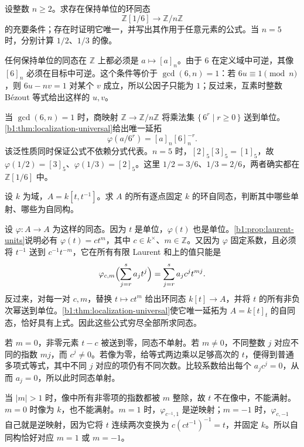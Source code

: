\begin{exercise}\label{b1:ex:13-10}
	设整数 \(n\geq2\)。求存在保持单位的环同态
	\[
		\mathbb Z[1/6]\longrightarrow\mathbb Z/n\mathbb Z
	\]
	的充要条件；存在时证明它唯一，并写出其作用于任意元素的公式。当 \(n=5\) 时，分别计算 \(1/2\)、\(1/3\) 的像。
\end{exercise}
\begin{solution}
	任何保持单位的同态在 \(\mathbb Z\) 上都必须是 \(a\mapsto[a]_n\)。由于 \(6\) 在定义域中可逆，其像 \([6]_n\) 必须在目标中可逆。这个条件等价于 \(\gcd(6,n)=1\)：若 \(6u\equiv1\pmod n\)，则 \(6u-nv=1\) 对某个 \(v\) 成立，所以公因子只能为 \(1\)；反过来，互素时整数 Bézout 等式给出这样的 \(u,v\)。

	当 \(\gcd(6,n)=1\) 时，商映射 \(\mathbb Z\rightarrow\mathbb Z/n\mathbb Z\) 将乘法集 \(\{\,6^r\mid r\geq0\,\}\) 送到单位。\cref{b1:thm:localization-universal}给出唯一延拓
	\[
		\varphi(a/6^r)=[a]_n[6]_n^{-r}.
	\]
	该泛性质同时保证公式不依赖分式代表。\(n=5\) 时，\([2]_5[3]_5=[1]_5\)，故 \(\varphi(1/2)=[3]_5\)、\(\varphi(1/3)=[2]_5\)。这里 \(1/2=3/6\)、\(1/3=2/6\)，两者确实都在 \(\mathbb Z[1/6]\) 中。
\end{solution}

\begin{exercise}\label{b1:ex:13-11}
	设 \(k\) 为域，\(A=k[t,t^{-1}]\)。求 \(A\) 的所有逐点固定 \(k\) 的环自同态，判断其中哪些单射、哪些为自同构。
\end{exercise}
\begin{solution}
	设 \(\varphi:A\rightarrow A\) 为这样的同态。因为 \(t\) 是单位，\(\varphi(t)\) 也是单位。\cref{b1:prop:laurent-units}说明必有 \(\varphi(t)=ct^m\)，其中 \(c\in k^\times\)、\(m\in\mathbb Z\)。又因为 \(\varphi\) 固定系数，且必须将 \(t^{-1}\) 送到 \(c^{-1}t^{-m}\)，它在所有有限 Laurent 和上的值只能是
	\[
		\varphi_{c,m}\Bigl(\sum_{j=r}^{s}a_jt^j\Bigr) =\sum_{j=r}^{s}a_jc^jt^{mj}.
	\]
	反过来，对每一对 \(c,m\)，替换 \(t\mapsto ct^m\) 给出环同态 \(k[t]\rightarrow A\)，并将 \(t\) 的所有非负次幂送到单位。\cref{b1:thm:localization-universal}使它唯一延拓为 \(A=k[t]_t\) 的自同态，恰好具有上式。因此这些公式穷尽全部所求同态。

	若 \(m=0\)，非零元素 \(t-c\) 被送到零，同态不单射。若 \(m\neq0\)，不同整数 \(j\) 对应不同的指数 \(mj\)，而 \(c^j\neq0\)。若像为零，给等式两边乘以足够高次的 \(t\)，便得到普通多项式等式，其中不同 \(j\) 对应的项仍有不同次数。比较系数给出每个 \(a_jc^j=0\)，从而 \(a_j=0\)，所以此时同态单射。

	当 \(|m|>1\) 时，像中所有非零项的指数都被 \(m\) 整除，故 \(t\) 不在像中，不能满射。\(m=0\) 时像为 \(k\)，也不能满射。\(m=1\) 时，\(\varphi_{c^{-1},1}\) 是逆映射；\(m=-1\) 时，\(\varphi_{c,-1}\) 自己就是逆映射，因为它将 \(t\) 连续两次变换为 \(c(ct^{-1})^{-1}=t\)，并固定 \(k\)。所以自同构恰好对应 \(m=1\) 或 \(m=-1\)。
\end{solution}

